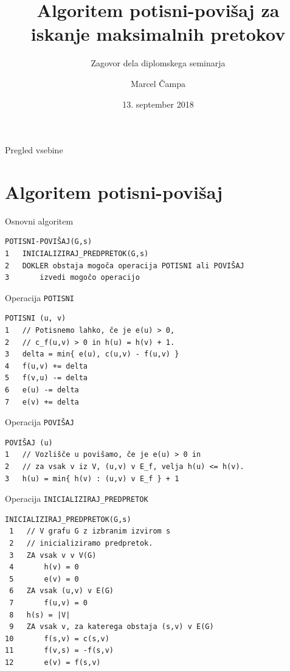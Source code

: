 \documentclass{beamer}
\title[Algoritem potisni-povišaj]{Algoritem potisni-povišaj za iskanje maksimalnih pretokov}
\subtitle{Zagovor dela diplomskega seminarja}
\author{Marcel Čampa}
\date{13. september 2018}
\institute[FMF UL]{Fakulteta za matematiko Univerze v Ljubljani}
\begin{document}
\begin{frame}
\maketitle
\end{frame}

\begin{frame}{Pregled vsebine}
\tableofcontents
\end{frame}

\section{Algoritem potisni-povišaj}
\begin{frame}[fragile]{Osnovni algoritem}
\begin{verbatim}
POTISNI-POVIŠAJ(G,s)
1   INICIALIZIRAJ_PREDPRETOK(G,s)
2   DOKLER obstaja mogoča operacija POTISNI ali POVIŠAJ
3       izvedi mogočo operacijo
\end{verbatim}
\end{frame}

\begin{frame}[fragile]{Operacija \texttt{POTISNI}}
\begin{verbatim}
POTISNI (u, v)
1   // Potisnemo lahko, če je e(u) > 0,
2   // c_f(u,v) > 0 in h(u) = h(v) + 1.
3   delta = min{ e(u), c(u,v) - f(u,v) }
4   f(u,v) += delta
5   f(v,u) -= delta
6   e(u) -= delta
7   e(v) += delta
\end{verbatim}
\end{frame}

\begin{frame}[fragile]{Operacija \texttt{POVIŠAJ}}
\begin{verbatim}
POVIŠAJ (u)
1   // Vozlišče u povišamo, če je e(u) > 0 in
2   // za vsak v iz V, (u,v) v E_f, velja h(u) <= h(v).
3   h(u) = min{ h(v) : (u,v) v E_f } + 1
\end{verbatim}
\end{frame}

\begin{frame}[fragile]{Operacija \texttt{INICIALIZIRAJ\_PREDPRETOK}}
\begin{verbatim}
INICIALIZIRAJ_PREDPRETOK(G,s)
 1   // V grafu G z izbranim izvirom s
 2   // inicializiramo predpretok.
 3   ZA vsak v v V(G)
 4       h(v) = 0
 5       e(v) = 0
 6   ZA vsak (u,v) v E(G)
 7       f(u,v) = 0
 8   h(s) = |V|
 9   ZA vsak v, za katerega obstaja (s,v) v E(G)
10       f(s,v) = c(s,v)
11       f(v,s) = -f(s,v)
12       e(v) = f(s,v)
\end{verbatim}
\end{frame}
\end{document}
